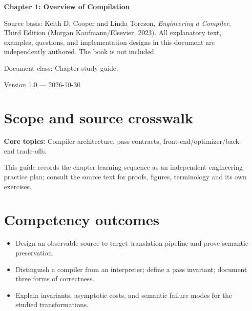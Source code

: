 \documentclass[10pt,letterpaper]{article}
\begin{document}
\begin{titlepage}
\centering\vspace*{1.0in}
{\Huge\bfseries\textcolor{CompilerBlue}{Chapter 1: Overview of Compilation}\par}
\vspace{.22in}{\Large Critical reading, original exercises, evidence and review\par}
\vspace{.4in}{\large Compiler Engineering Documentation Suite\par}
\vfill
\begin{minipage}{.86\linewidth}\small
Source basis: Keith D. Cooper and Linda Torczon, \emph{Engineering a Compiler}, Third Edition (Morgan Kaufmann/Elsevier, 2023). All explanatory text, examples, questions, and implementation designs in this document are independently authored. The book is not included.\par\medskip
Document class: Chapter study guide.
\end{minipage}
\vfill\textcolor{CompilerGray}{Version 1.0 --- 2026-10-30}\par
\end{titlepage}
\tableofcontents\clearpage
\section{Scope and source crosswalk}
\textbf{Core topics:} Compiler architecture, pass contracts, front-end/optimizer/back-end trade-offs.

This guide records the chapter learning sequence as an independent engineering practice plan; consult the source text for proofs, figures, terminology and its own exercises.

\section{Competency outcomes}
\begin{itemize}
\item Design an observable source-to-target translation pipeline and prove semantic preservation.
\item Distinguish a compiler from an interpreter; define a pass invariant; document three forms of correctness.
\item Explain invariants, asymptotic costs, and semantic failure modes for the studied transformations.
\end{itemize}
\end{document}
